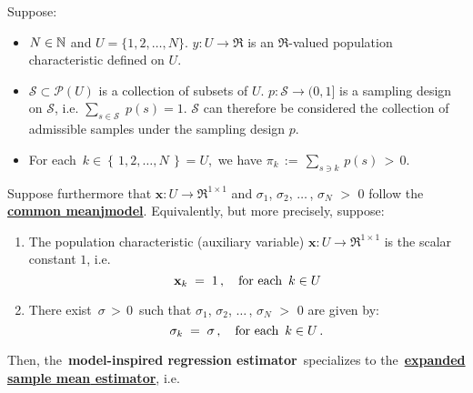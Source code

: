 \begin{proposition}
\mbox{}
\vskip 0.05cm
\noindent
Suppose:
\begin{itemize}
\item
	$N \in \mathbb{N}$ and $U = \{1,2,\ldots,N\}$.
	\vskip 0.05cm
	$y : U \longrightarrow \Re$ is an $\Re$-valued population characteristic defined on $U$.
\item
	$\mathcal{S} \subset \mathcal{P}(U)$ is a collection of subsets of $U$.
	$p : \mathcal{S} \longrightarrow (0,1]$ is a sampling design on $\mathcal{S}$,
	i.e. $\underset{s\in\mathcal{S}}{\sum}\;p(s) = 1$.
	\vskip 0.05cm
	$\mathcal{S}$ can therefore be considered the collection of admissible samples under the sampling design $p$.
\item
	For each \,$k \in \left\{\,1,2,\ldots,N\,\right\} = U$,\, we have
	$\pi_{k} \,:=\, \underset{s \ni k}{\sum}\,p(s) \,>\, 0$.
\end{itemize}
Suppose furthermore that
$\mathbf{x} : U \longrightarrow \Re^{1 \times 1}$ and
$\sigma_{1}$, $\sigma_{2}$, $\ldots$\,, $\sigma_{N}$ $>$ $0$
follow the \,\underline{\textbf{{\color{red}common mean}{\color{white}j}model}}.
\renewcommand{\theenumi}{\alph{enumi}}
\renewcommand{\labelenumi}{\textnormal{(\theenumi)}$\;\;$}
\vskip 0.1cm
\noindent
Equivalently, but more precisely, suppose:
\begin{enumerate}
\item \vskip -0.10cm
	The population characteristic (auxiliary variable)
	$\mathbf{x} : U \longrightarrow \Re^{1 \times 1}$ is the scalar constant $1$, i.e.
	\begin{equation*}
	\mathbf{x}_{k}
		\; = \; 1\,,
	\quad\textnormal{for each \,$k \in U$}
	\end{equation*}
\item
	There exist \,$\sigma \,>\, 0$\, such that
	$\sigma_{1}$, $\sigma_{2}$, $\ldots$\,, $\sigma_{N}$ $>$ $0$ are given by:
	\begin{equation*}
	\sigma_{k} \; = \; \sigma\,,
	\quad\textnormal{for each \,$k \in U$}\,.
	\end{equation*}
\end{enumerate}
\renewcommand{\theenumi}{\roman{enumi}}
\renewcommand{\labelenumi}{\textnormal{(\theenumi)}$\;\;$}
Then, the \,\textbf{model-inspired regression estimator}\,
specializes to the \,\underline{\textbf{{\color{red}expanded sample mean} estimator}}, i.e.
\begin{eqnarray*}

\end{eqnarray*}
\end{proposition}
